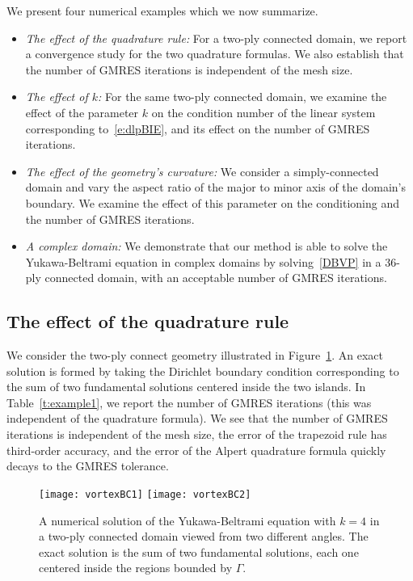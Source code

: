 \documentclass[final]{siamltex}
\begin{document}
We present four numerical examples which we now summarize.
\begin{itemize}
  \item{\em{The effect of the quadrature rule}:} For a two-ply connected
  domain, we report a convergence study for the two quadrature formulas.
  We also establish that the number of GMRES iterations is independent
  of the mesh size.

  \item{\em{The effect of $k$}:} For the same two-ply connected domain,
  we examine the effect of the parameter $k$ on the condition number of
  the linear system corresponding to~\eqref{e:dlpBIE}, and its effect on
  the number of GMRES iterations.

  \item{\em{The effect of the geometry's curvature}:} We consider a
  simply-connected domain and vary the aspect ratio of the major to
  minor axis of the domain's boundary.  We examine the effect of this
  parameter on the conditioning and the number of GMRES iterations.

  \item{\em{A complex domain}:} We demonstrate that our method is able
  to solve the Yukawa-Beltrami equation in complex domains by
  solving~\eqref{DBVP} in a 36-ply connected domain, with an acceptable
  number of GMRES iterations.
\end{itemize}


\subsection{The effect of the quadrature rule}
We consider the two-ply connect geometry illustrated in
Figure~\ref{f:twoply}.  An exact solution is formed by taking the
Dirichlet boundary condition corresponding to the sum of two fundamental
solutions centered inside the two islands.  In Table~\ref{t:example1},
we report the number of GMRES iterations (this was independent of the
quadrature formula).  We see that the number of GMRES iterations is
independent of the mesh size, the error of the trapezoid rule has
third-order accuracy, and the error of the Alpert quadrature formula
quickly decays to the GMRES tolerance.

\begin{figure}[htps]
  \texttt{[image: vortexBC1]}
  \texttt{[image: vortexBC2]}
\caption{\label{f:twoply} A numerical solution of the Yukawa-Beltrami
equation with $k=4$ in a two-ply connected domain viewed from two
different angles.  The exact solution is the sum of two fundamental
solutions, each one centered inside the regions bounded by $\Gamma$.}
\end{figure}
\end{document}
